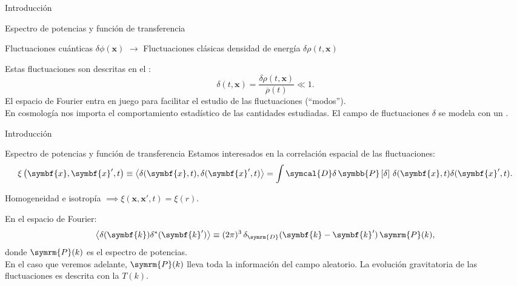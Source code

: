 \begin{frame}{Introducción}
    \begin{block}{Espectro de potencias y función de transferencia}
        \begin{center}
            Fluctuaciones cuánticas \(\delta\phi(\symbf{x})\) \(\longrightarrow\) Fluctuaciones clásicas densidad de energía \(\delta\rho(t,\symbf{x})\)
        \end{center}
        Estas fluctuaciones son descritas en el :
        \begin{equation*}
            \delta(t,\symbf{x})=\frac{\delta\rho(t,\symbf{x})}{\overbar{\rho}(t)}\ll 1.
        \end{equation*}
        El espacio de Fourier entra en juego para facilitar el estudio de las fluctuaciones (``modos'').\\
        En cosmología nos importa el comportamiento estadístico de las cantidades estudiadas. El campo de fluctuaciones \(\delta\) se modela con un .
    \end{block}
\end{frame}
\begin{frame}{Introducción}
    \begin{block}{Espectro de potencias y función de transferencia}
        Estamos interesados en la correlación espacial de las fluctuaciones:
        \begin{equation*}
            \xi\left(\symbf{x},\symbf{x}',t\right)\equiv\left\langle\delta(\symbf{x},t),\delta(\symbf{x}',t)\right\rangle=\int\symcal{D}\delta\,\symbb{P}\left[\delta\right]\,\delta(\symbf{x},t)\delta(\symbf{x}',t).
        \end{equation*}
        \begin{center}
            Homogeneidad e isotropía \(\implies\xi\left(\symbf{x},\symbf{x}',t\right)=\xi(r)\).
        \end{center}
        En el espacio de Fourier:
        \begin{equation*}
            \left\langle\delta(\symbf{k})\delta^{*}(\symbf{k}')\right\rangle\equiv (2\pi)^3\,\delta_{\symrm{D}}(\symbf{k}-\symbf{k}')\,\symrm{P}(k),
        \end{equation*}
        donde \(\symrm{P}(k)\) es el espectro de potencias.\\[.3cm]
        En el caso que veremos adelante, \(\symrm{P}(k)\) lleva toda la información del campo aleatorio. La evolución gravitatoria de las fluctuaciones es descrita con la  \(T(k)\).
    \end{block}
\end{frame}
